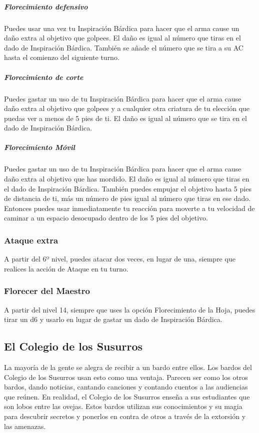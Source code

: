 \documentclass[a4paper,twocolumn,openany,10pt]{dndbook}
\begin{document}
\subparagraph{Florecimiento defensivo} Puedes usar una vez tu Inspiración Bárdica para hacer que el arma cause un daño extra al objetivo que
golpees. El daño es igual al número que tiras en el dado de Inspiración Bárdica. También se añade el número que se tira a su AC hasta el
comienzo del siguiente turno.

\subparagraph{Florecimiento de corte} Puedes gastar un uso de tu Inspiración Bárdica para hacer que el arma cause daño extra al objetivo que
golpees y a cualquier otra criatura de tu elección que puedas ver a menos de 5 pies de ti. El daño es igual al número que se tira en el dado
de Inspiración Bárdica.

\subparagraph{Florecimiento Móvil} Puedes gastar un uso de tu Inspiración Bárdica para hacer que el arma cause daño extra al objetivo que has
mordido. El daño es igual al número que tiras en el dado de Inspiración Bárdica. También puedes empujar el objetivo hasta 5 pies de distancia
de ti, más un número de pies igual al número que tiras en ese dado. Entonces puedes usar inmediatamente tu reacción para moverte a tu
velocidad de caminar a un espacio desocupado dentro de los 5 pies del objetivo. 

\subsubsection{Ataque extra}
A partir del 6º nivel, puedes atacar dos veces, en lugar de una, siempre que realices la acción de Ataque en tu turno. 

\subsubsection{Florecer del Maestro}
A partir del nivel 14, siempre que uses la opción Florecimiento de la Hoja, puedes tirar un d6 y usarlo en lugar de gastar un dado de
Inspiración Bárdica.

\subsection{El Colegio de los Susurros}

La mayoría de la gente se alegra de recibir a un bardo entre ellos. Los bardos del Colegio de los Susurros usan esto como una ventaja.
Parecen ser como los otros bardos, dando noticias, cantando canciones y contando cuentos a las audiencias que reúnen. En realidad, el Colegio
de los Susurros enseña a sus estudiantes que son lobos entre las ovejas. Estos bardos utilizan sus conocimientos y su magia para descubrir
secretos y ponerlos en contra de otros a través de la extorsión y las amenazas.
\end{document}
